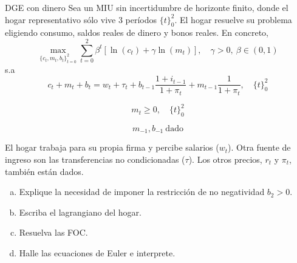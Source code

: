 \documentclass[letterpaper, 11pt]{extarticle}
\begin{document}
\begin{problem}{DGE con dinero}{}
Sea un MIU sin incertidumbre de horizonte finito, donde el hogar representativo sólo vive 3 períodos $\{t\}_0^2$. El hogar resuelve su problema eligiendo consumo, saldos reales de dinero y bonos reales. En concreto,
\begin{equation}
    \max_{\{c_t, m_t, b_t\}_{t=0}^{2}} \sum_{t=0}^{2} \beta^t \left[ \ln(c_t) + \gamma \ln(m_t) \right], \quad \gamma > 0, \ \beta \in (0,1)
\end{equation}
s.a
\begin{equation}
    c_t + m_t + b_t = w_t + \tau_t + b_{t-1} \frac{1 + i_{t-1}}{1 + \pi_t} + m_{t-1} \frac{1}{1 + \pi_t}, \quad \{t\}_0^2
\end{equation}

$$m_t \geq 0, \quad \{t\}_0^2$$

$$m_{-1}, b_{-1} \ \text{dado}$$

El hogar trabaja para su propia firma y percibe salarios ($w_t$). Otra fuente de ingreso son las transferencias no condicionadas ($\tau$). Los otros precios, $r_t$ y $\pi_t$, también están dados.

\begin{enumerate}[a)]
    \item Explique la necesidad de imponer la restricción de no negatividad $b_2>0$.
    \item Escriba el lagrangiano del hogar.
    \item Resuelva las FOC.
    \item Halle las ecuaciones de Euler e interprete.
\end{enumerate}
\end{problem}
\end{document}
